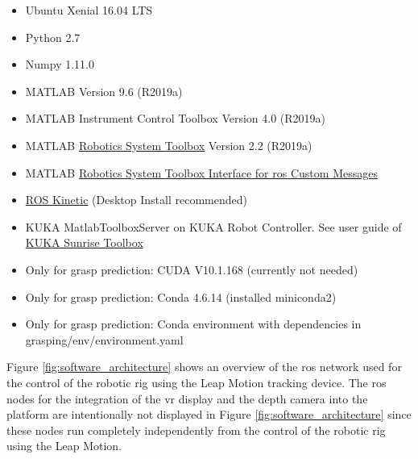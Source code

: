 \documentclass[headsepline,footinclude=false,fontsize=11pt,paper=a4,listof=totoc,bibliography=totoc,BCOR=12mm,DIV=14]{scrbook}
\begin{document}
\begin{itemize}
\item
  Ubuntu Xenial 16.04 LTS
\item
  Python 2.7
\item
  Numpy 1.11.0
\item
  MATLAB Version 9.6 (R2019a)
\item
  MATLAB Instrument Control Toolbox Version 4.0 (R2019a)
\item
  MATLAB \href{https://uk.mathworks.com/help/robotics/ug/install-robotics-system-toolbox-support-packages.html}{Robotics System Toolbox} Version 2.2 (R2019a)
\item
  MATLAB \href{https://uk.mathworks.com/matlabcentral/fileexchange/49810-robotics-system-toolbox-interface-for-ros-custom-messages}{Robotics System Toolbox Interface for \gls{ros} Custom Messages}
\item
  \href{http://wiki.ros.org/kinetic/Installation/Ubuntu}{ROS Kinetic} (Desktop Install recommended)
\item
  KUKA MatlabToolboxServer on KUKA Robot Controller. See user guide of \href{https://github.com/Modi1987/KST-Kuka-Sunrise-Toolbox}{KUKA Sunrise Toolbox}
\item
  Only for grasp prediction: CUDA V10.1.168 (currently not needed)
\item
  Only for grasp prediction: Conda 4.6.14 (installed miniconda2)
\item
  Only for grasp prediction: Conda environment with dependencies in grasping/env/environment.yaml
\end{itemize}


Figure \ref{fig:software_architecture} shows an overview of the \gls{ros} network used for the control of the robotic rig using the Leap Motion tracking device. The \gls{ros} nodes for the integration of the \gls{vr} display and the depth camera into the platform are intentionally not displayed in Figure \ref{fig:software_architecture} since these nodes run completely independently from the control of the robotic rig using the Leap Motion.
\end{document}
